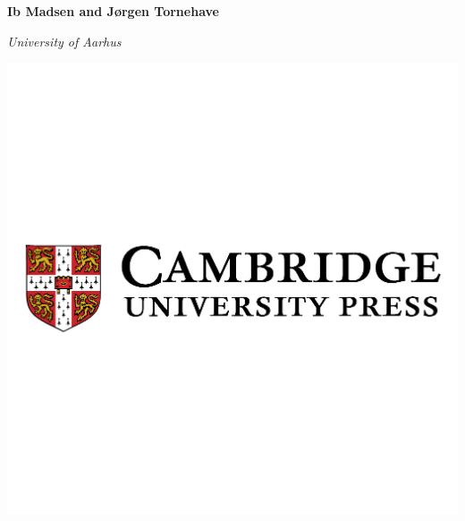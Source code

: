 \begin{titlepage}
\centering
\vspace*{7em}
{\par}
\vspace*{1.75em}
{\par}
\vspace*{3em}
{\Large\bfseries Ib Madsen and J\o{}rgen Tornehave\par}
\vspace*{1.75em}
{\large\itshape University of Aarhus\par}
\vspace*{\fill}
\includegraphics[width=.3\paperwidth]{./pics/cambridge-university-press-logo.pdf}
\end{titlepage}